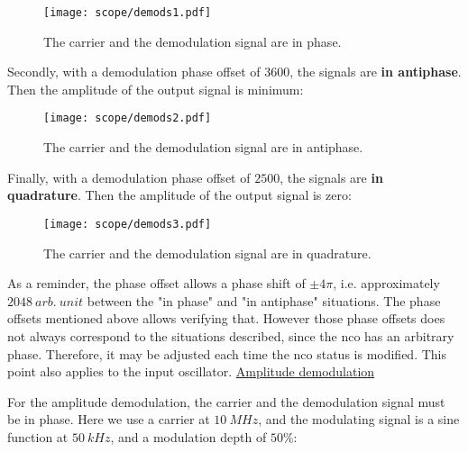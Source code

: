 \documentclass[12pt,oneside]{article}
\begin{document}
\begin{figure}[!h!tb]
	\begin{center}
		\texttt{[image: scope/demods1.pdf]}
		\caption{The carrier and the demodulation signal are in phase.}
		\label{curv:demodsine1}
	\end{center}
\end{figure}

Secondly, with a demodulation phase offset of $3600$, the signals are \textbf{in antiphase}. Then the amplitude of the output signal is minimum:
\newline

\begin{figure}[!h!tb]
	\begin{center}
		\texttt{[image: scope/demods2.pdf]}
		\caption{The carrier and the demodulation signal are in antiphase.}
		\label{curv:demodsine2}
	\end{center}
\end{figure}

Finally, with a demodulation phase offset of $2500$, the signals are \textbf{in quadrature}. Then the amplitude of the output signal is zero:

\begin{figure}[!h!tb]
	\begin{center}
		\texttt{[image: scope/demods3.pdf]}
		\caption{The carrier and the demodulation signal are in quadrature.}
		\label{curv:demodsine3}
	\end{center}
\end{figure}


As a reminder, the phase offset allows a phase shift of $\pm 4\pi$, i.e. approximately $2048~arb.~unit$ between the "in phase" and "in antiphase" situations. The phase offsets mentioned above allows verifying that. However those phase offsets does not always correspond to the situations described, since the nco has an arbitrary phase. Therefore, it may be adjusted each time the nco status is modified. This point also applies to the input oscillator. 
\newline\newline
\underline{Amplitude demodulation}\newline\newline

For the amplitude demodulation, the carrier and the demodulation signal must be in phase. Here we use a carrier at $10~MHz$, and the modulating signal is a sine function at $50~kHz$, and a modulation depth of $50\%$:
\end{document}
